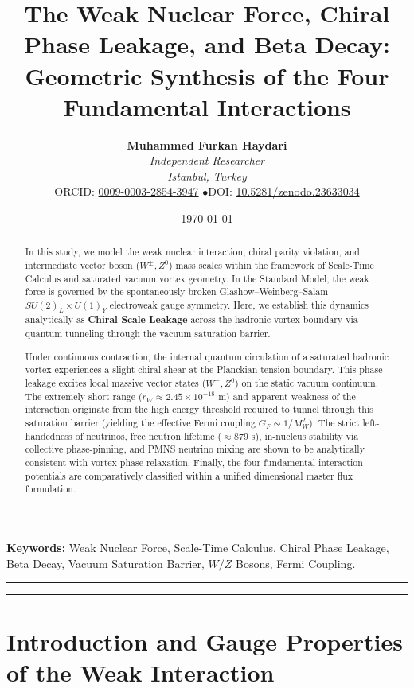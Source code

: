 \documentclass[11pt,a4paper]{article}
\title{\textbf{The Weak Nuclear Force, Chiral Phase Leakage, and Beta Decay: \\ Geometric Synthesis of the Four Fundamental Interactions}}
\author{
    \textbf{Muhammed Furkan Haydari} \\
    \textit{Independent Researcher} \\
    \textit{Istanbul, Turkey} \\
    \small ORCID: \href{https://orcid.org/0009-0003-2854-3947}{0009-0003-2854-3947} \quad$\bullet$\quad \small DOI: \href{https://doi.org/10.5281/zenodo.23633034}{10.5281/zenodo.23633034}
}
\date{\today}
\begin{document}
\maketitle

\begin{abstract}
    In this study, we model the weak nuclear interaction, chiral parity violation, and intermediate vector boson ($W^\pm, Z^0$) mass scales within the framework of Scale-Time Calculus and saturated vacuum vortex geometry. In the Standard Model, the weak force is governed by the spontaneously broken Glashow--Weinberg--Salam $SU(2)_L \times U(1)_Y$ electroweak gauge symmetry. Here, we establish this dynamics analytically as \textbf{Chiral Scale Leakage} across the hadronic vortex boundary via quantum tunneling through the vacuum saturation barrier.

    Under continuous contraction, the internal quantum circulation of a saturated hadronic vortex experiences a slight chiral shear at the Planckian tension boundary. This phase leakage excites local massive vector states ($W^\pm, Z^0$) on the static vacuum continuum. The extremely short range ($r_W \approx 2.45 \times 10^{-18}\text{ m}$) and apparent weakness of the interaction originate from the high energy threshold required to tunnel through this saturation barrier (yielding the effective Fermi coupling $G_F \sim 1/M_W^2$). The strict left-handedness of neutrinos, free neutron lifetime ($\approx 879\text{ s}$), in-nucleus stability via collective phase-pinning, and PMNS neutrino mixing are shown to be analytically consistent with vortex phase relaxation. Finally, the four fundamental interaction potentials are comparatively classified within a unified dimensional master flux formulation.
\end{abstract}

\vspace{1em}
\noindent\textbf{Keywords:} Weak Nuclear Force, Scale-Time Calculus, Chiral Phase Leakage, Beta Decay, Vacuum Saturation Barrier, $W/Z$ Bosons, Fermi Coupling.

\vspace{1em}
\hrule
\vspace{0.8em}
\tableofcontents
\vspace{0.8em}
\hrule
\vspace{1.5em}

\section{Introduction and Gauge Properties of the Weak Interaction}
\label{sec:giris}
\end{document}
